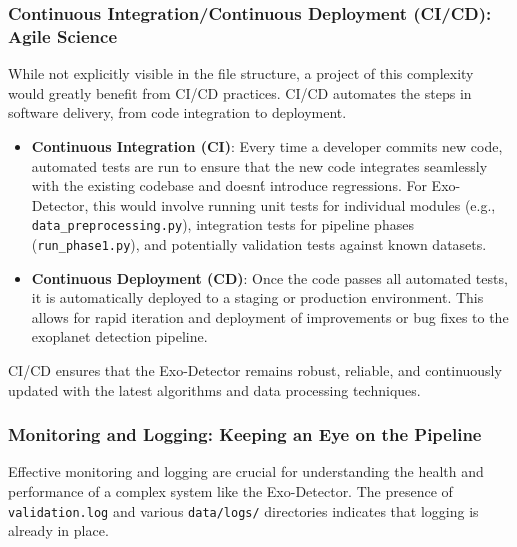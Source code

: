 \documentclass{article}
\begin{document}
\subsubsection{Continuous Integration/Continuous Deployment (CI/CD): Agile Science}

While not explicitly visible in the file structure, a project of this complexity would greatly benefit from CI/CD practices. CI/CD automates the steps in software delivery, from code integration to deployment.

\begin{itemize}
    \item \textbf{Continuous Integration (CI)}: Every time a developer commits new code, automated tests are run to ensure that the new code integrates seamlessly with the existing codebase and doesn\'t introduce regressions. For Exo-Detector, this would involve running unit tests for individual modules (e.g., \texttt{data\_preprocessing.py}), integration tests for pipeline phases (\texttt{run\_phase1.py}), and potentially validation tests against known datasets.
    \item \textbf{Continuous Deployment (CD)}: Once the code passes all automated tests, it is automatically deployed to a staging or production environment. This allows for rapid iteration and deployment of improvements or bug fixes to the exoplanet detection pipeline.
\end{itemize}

CI/CD ensures that the Exo-Detector remains robust, reliable, and continuously updated with the latest algorithms and data processing techniques.

\subsubsection{Monitoring and Logging: Keeping an Eye on the Pipeline}

Effective monitoring and logging are crucial for understanding the health and performance of a complex system like the Exo-Detector. The presence of \texttt{validation.log} and various \texttt{data/logs/} directories indicates that logging is already in place.
\end{document}
